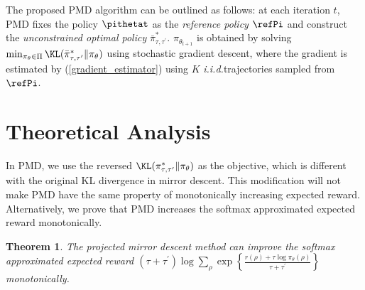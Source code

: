 \documentclass{article}
\newtheorem{thm}{Theorem}
\begin{document}
The proposed PMD algorithm can be outlined as follows: at each iteration $t$, PMD fixes the policy $\pithetat$ as the \emph{reference policy} $\refPi$ and construct the \emph{unconstrained optimal policy} $\bar{\pi}_{\tau, \tau^{\prime}}^*$. $\pi_{\theta_{t+1}}$ is obtained by solving $\min_{\pi_\theta \in \Pi}{\KL(\bar{\pi}_{\tau,\tau^{\prime}}^* \| \pi_\theta})$ using stochastic gradient descent, where the gradient is estimated by (\ref{gradient_estimator}) using $K$ \emph{i.i.d.}trajectories sampled from $\refPi$.

\section{Theoretical Analysis}

In PMD, we use the reversed $\KL(\pi_{\tau,\tau^{\prime}}^* \| \pi_\theta)$ as the objective, which is different with the original KL divergence in mirror descent. This modification will not make PMD have the same property of monotonically increasing expected reward. Alternatively, we prove that PMD increases the softmax approximated expected reward monotonically.
\begin{thm}
\label{monotonically_increasing_sr_property}
The projected mirror descent method can improve the softmax approximated expected reward $(\tau + \tau^{\prime})\log{ \sum\limits_{\rho}{ \exp\left\{ \frac{r(\rho) + \tau \log{\pi_\theta(\rho)} }{\tau + \tau^{\prime}} \right\} }}$ monotonically.
\end{thm}
\end{document}
